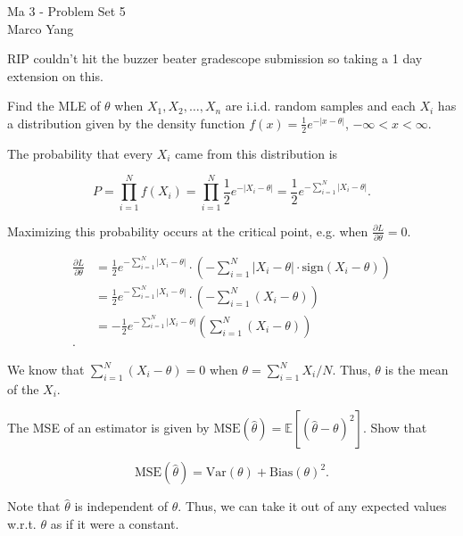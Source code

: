 \documentclass[answers]{exam}
\begin{document}
\begin{center}
{\Large Ma 3 - Problem Set 5} \\
\medskip
Marco Yang \\
\bigskip
\end{center}

RIP couldn't hit the buzzer beater gradescope submission so taking a 1 day extension on this.

\begin{questions}
\question [25] Find the MLE of $\theta$ when $X_1,X_2,\ldots,X_{n}$ are i.i.d.
random samples and each $X_{i}$ has a distribution given by the density function 
$f(x)=\frac{1}{2}e^{-|x-\theta|}$, $-\infty<x<\infty$.

\begin{solution}
The probability that every $X_{i}$ came from this distribution is


\[
P = \prod_{i=1}^{N} f(X_{i}) = \prod_{i=1}^{N} \frac{1}{2}e^{-|X_{i}-\theta|} = \frac{1}{2}e^{-\sum_{i=1}^{N}|X_{i}-\theta|}
.\] 

Maximizing this probability occurs at the critical point, e.g. when 
$\frac{\partial L}{\partial \theta} = 0$.

\begin{align*}
\frac{\partial L}{\partial \theta} &= \frac{1}{2}e^{-\sum_{i=1}^{N}|X_{i}-\theta|} \cdot \left( -\sum_{i=1}^{N} |X_{i} - \theta| \cdot \text{sign}(X_{i}-\theta) \right) \\
&= \frac{1}{2}e^{-\sum_{i=1}^{N}|X_{i}-\theta|} \cdot \left( -\sum_{i=1}^{N} (X_{i} - \theta) \right)  \\ 
&= -\frac{1}{2}e^{-\sum_{i=1}^{N}|X_{i}-\theta|} \left( \sum_{i=1}^{N} (X_{i} - \theta) \right)  \\ 
.\end{align*}

We know that $\sum_{i=1}^{N}(X_{i}-\theta) = 0$ when $\theta = \sum_{i=1}^{N}
X_{i} / N$. Thus, $\theta$ is the mean of the $X_{i}$.
\end{solution}

\question [25] The MSE of an estimator is given by $\text{MSE}(\hat{\theta}) 
= \mathbb{E}[(\hat{\theta}-\theta)^2]$. Show that 

\[
\text{MSE}(\hat{\theta}) = \text{Var}(\theta) + \text{Bias}(\theta)^2
.\] 

\begin{solution}
Note that $\hat{\theta}$ is independent of $\theta$. Thus, we can take it out of
any expected values w.r.t. $\theta$ as if it were a constant.


\end{solution}
\end{questions}
\end{document}
